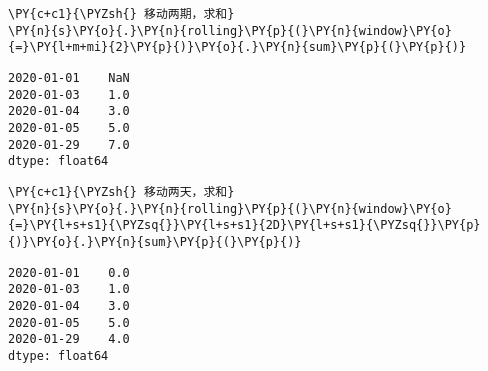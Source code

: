     \begin{tcolorbox}[breakable, size=fbox, boxrule=1pt, pad at break*=1mm,colback=cellbackground, colframe=cellborder]
\begin{Verbatim}[commandchars=\\\{\}]
\PY{c+c1}{\PYZsh{} 移动两期，求和}
\PY{n}{s}\PY{o}{.}\PY{n}{rolling}\PY{p}{(}\PY{n}{window}\PY{o}{=}\PY{l+m+mi}{2}\PY{p}{)}\PY{o}{.}\PY{n}{sum}\PY{p}{(}\PY{p}{)}
\end{Verbatim}
\end{tcolorbox}

            \begin{tcolorbox}[breakable, size=fbox, boxrule=.5pt, pad at break*=1mm, opacityfill=0]
\begin{Verbatim}[commandchars=\\\{\}]
2020-01-01    NaN
2020-01-03    1.0
2020-01-04    3.0
2020-01-05    5.0
2020-01-29    7.0
dtype: float64
\end{Verbatim}
\end{tcolorbox}
        
    \begin{tcolorbox}[breakable, size=fbox, boxrule=1pt, pad at break*=1mm,colback=cellbackground, colframe=cellborder]
\begin{Verbatim}[commandchars=\\\{\}]
\PY{c+c1}{\PYZsh{} 移动两天，求和}
\PY{n}{s}\PY{o}{.}\PY{n}{rolling}\PY{p}{(}\PY{n}{window}\PY{o}{=}\PY{l+s+s1}{\PYZsq{}}\PY{l+s+s1}{2D}\PY{l+s+s1}{\PYZsq{}}\PY{p}{)}\PY{o}{.}\PY{n}{sum}\PY{p}{(}\PY{p}{)}
\end{Verbatim}
\end{tcolorbox}

            \begin{tcolorbox}[breakable, size=fbox, boxrule=.5pt, pad at break*=1mm, opacityfill=0]
\begin{Verbatim}[commandchars=\\\{\}]
2020-01-01    0.0
2020-01-03    1.0
2020-01-04    3.0
2020-01-05    5.0
2020-01-29    4.0
dtype: float64
\end{Verbatim}
\end{tcolorbox}
